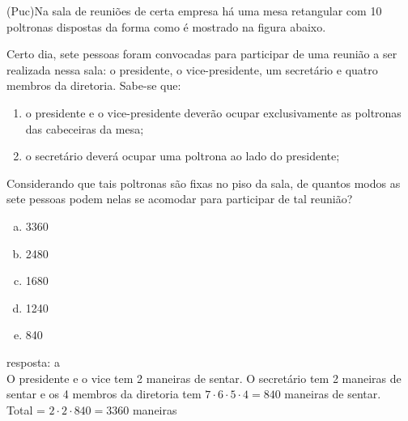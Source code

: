 \begin{ex}
  (Puc)Na sala de reuniões de certa empresa há uma mesa retangular com 10 poltronas dispostas da forma como é mostrado na figura abaixo.
  \begin{center}
  \end{center}
  Certo dia, sete pessoas foram convocadas para participar de uma reunião a ser realizada nessa sala: o presidente, o vice-presidente, um secretário e quatro membros da diretoria. Sabe-se que:
    \begin{enumerate} [--]
        \item o presidente e o vice-presidente deverão ocupar exclusivamente as poltronas das cabeceiras da mesa;
        \item o secretário deverá ocupar uma poltrona ao lado do presidente;
    \end{enumerate}
  Considerando que tais poltronas são fixas no piso da sala, de quantos modos as sete pessoas podem nelas se acomodar para participar de tal reunião?
    \begin{enumerate} [(a)]
        \item 3360
        \item 2480
        \item 1680
        \item 1240
        \item 840
    \end{enumerate}
      \begin{sol}
      resposta: a \\
      O presidente e o vice tem 2 maneiras de sentar. O secretário tem 2 maneiras de sentar e os 4 membros da diretoria tem $7\cdot6\cdot5\cdot4= 840$ maneiras de sentar. \\
      Total = $2\cdot2\cdot840=3360$ maneiras
      \end{sol}
 \end{ex}
